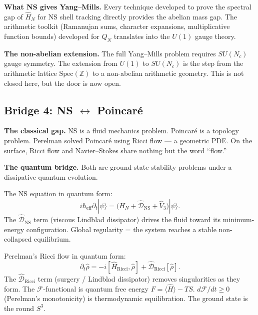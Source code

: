 \documentclass[12pt]{article}
\newcommand{\ket}[1]{|{#1}\rangle}
\begin{document}
\textbf{What NS gives Yang--Mills.}
Every technique developed to prove the spectral gap of $\hat{H}_N$
for NS shell tracking directly provides the abelian mass gap.
The arithmetic toolkit (Ramanujan sums, character expansions,
multiplicative function bounds) developed for $Q_N$
translates into the $U(1)$ gauge theory.

\textbf{The non-abelian extension.}
The full Yang--Mills problem requires $SU(N_c)$ gauge symmetry.
The extension from $U(1)$ to $SU(N_c)$ is the step from
the arithmetic lattice $\mathrm{Spec}(\mathbb{Z})$
to a non-abelian arithmetic geometry.
This is not closed here, but the door is now open.

\subsection{Bridge 4: NS $\longleftrightarrow$ Poincar\'{e}}
\label{sec:bridge-poincare}

\textbf{The classical gap.}
NS is a fluid mechanics problem.
Poincar\'{e} is a topology problem.
Perelman solved Poincar\'{e} using Ricci flow --- a geometric PDE.
On the surface, Ricci flow and Navier--Stokes share nothing but
the word ``flow.''

\textbf{The quantum bridge.}
Both are ground-state stability problems under a dissipative quantum evolution.

\medskip
The NS equation in quantum form:
\[
  i\hbar_{\mathrm{eff}}\partial_t\ket{\psi}
  = \bigl(\hat{H}_N + \hat{\mathcal{D}}_{\mathrm{NS}} + \hat{V}_3\bigr)\ket{\psi}.
\]
The $\hat{\mathcal{D}}_{\mathrm{NS}}$ term (viscous Lindblad dissipator)
drives the fluid toward its minimum-energy configuration.
Global regularity = the system reaches a stable non-collapsed equilibrium.

Perelman's Ricci flow in quantum form:
\[
  \partial_t\hat{\rho} = -i[\hat{H}_{\mathrm{Ricci}},\hat{\rho}]
  + \hat{\mathcal{D}}_{\mathrm{Ricci}}[\hat{\rho}].
\]
The $\hat{\mathcal{D}}_{\mathrm{Ricci}}$ term (surgery / Lindblad dissipator)
removes singularities as they form.
The $\mathcal{F}$-functional is quantum free energy $F = \langle\hat{H}\rangle - TS$.
$d\mathcal{F}/dt \ge 0$ (Perelman's monotonicity) is thermodynamic equilibration.
The ground state is the round $S^3$.
\end{document}
